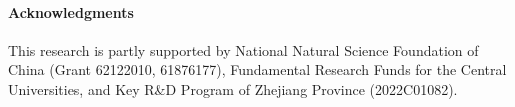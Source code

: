 \documentclass[10pt,twocolumn,letterpaper]{article}
\begin{document}
\paragraph{Acknowledgments} This research is partly supported by National Natural Science Foundation of China (Grant 62122010, 61876177), Fundamental Research Funds for the Central Universities, and Key R\&D Program of Zhejiang Province (2022C01082). 

{\small


}
\end{document}
